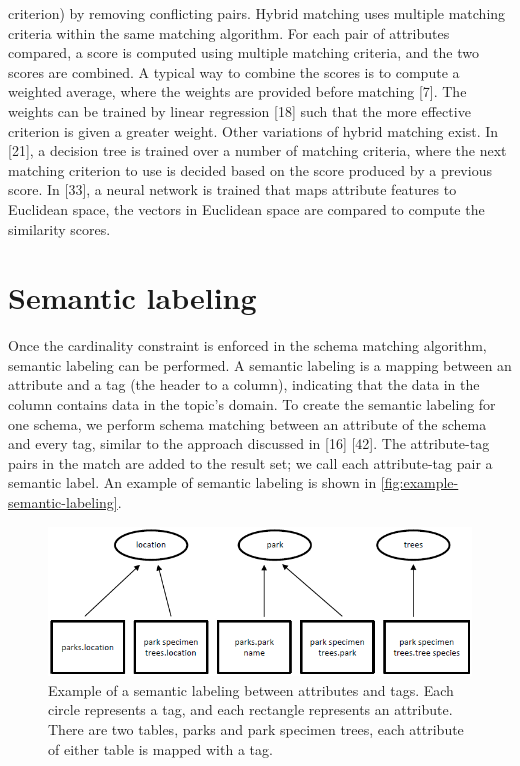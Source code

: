 criterion) by removing conflicting pairs. Hybrid matching uses multiple matching criteria within the same matching algorithm. For each pair of attributes compared, a score is computed using multiple matching criteria, and the two scores are combined. A typical way to combine the scores is to compute a weighted average, where the weights are provided before matching \cite{DBLP:journals/debu/ChenGHTD18}[7]. The weights can be trained by linear regression \cite{Ehrig2004QOM}[18] such that the more effective criterion is given a greater weight. Other variations of hybrid matching exist. In \cite{Giunchiglia2005Semantic}[21], a decision tree is trained over a number of matching criteria, where the next matching criterion to use is decided based on the score produced by a previous score. In \cite{Moawed2018Arabian}[33], a neural network is trained that maps attribute features to Euclidean space, the vectors in Euclidean space are compared to compute the similarity scores.

\section{Semantic labeling}
\label{sec:SemanticLabeling}

Once the cardinality constraint is enforced in the schema matching algorithm, semantic labeling can be performed. A semantic labeling is a mapping between an attribute and a tag (the header to a column), indicating that the data in the column contains data in the topic's domain. To create the semantic labeling for one schema, we perform schema matching between an attribute of the schema and every tag, similar to the approach discussed in \cite{Dong2012Proceedings}[16] \cite{Salakhutdinov2009Semantic}[42]. The attribute-tag pairs in the match are added to the result set; we call each attribute-tag pair a semantic label. An example of semantic labeling is shown in \autoref{fig:example-semantic-labeling}.

\begin{figure}
    \centering
    \includegraphics[width=5in]{figures/example-semantic-labeling.png}
    \caption{Example of a semantic labeling between attributes and tags.
    Each circle represents a tag, and each rectangle represents an attribute. There are two tables, parks and park specimen trees, each attribute of either table is mapped with a tag.}
    \label{fig:example-semantic-labeling}
\end{figure}

